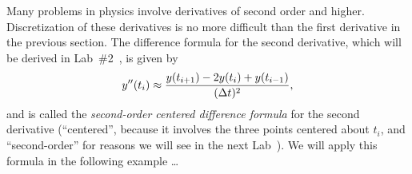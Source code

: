 Many problems in physics involve derivatives of second order and 
higher.  Discretization of these derivatives is no more difficult than
the first derivative in the previous section.
The difference formula for the second derivative, which will be
derived in Lab~\#2~, is given by
\begin{equation}
  y^{\prime\prime}(t_i) \approx 
  \frac{y(t_{i+1})-2y(t_i)+y(t_{i-1})}{(\mbox{$\Delta t$}{})^2} ,
  \label{lab1:eq:centered-diff2}
\end{equation}
and is called the \emph{second-order centered difference formula} for
the second derivative (``centered'', because it involves the three
points centered about $t_i$, and ``second-order'' for reasons we will
see in the next Lab~).
We will apply this formula in the following example \dots

